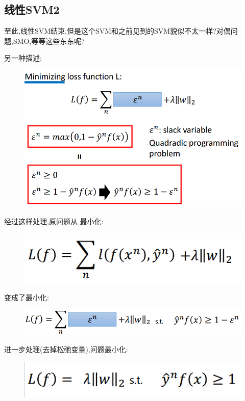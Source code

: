 \documentclass[UTF8,a4paper]{ctexart}
\begin{document}
        \subsection{线性SVM2}
        {\color{red} 至此,线性SVM结束,但是这个SVM和之前见到的SVM貌似不太一样?对偶问题,SMO,等等这些东东呢?}

        另一种描述:
        \begin{figure}[H]
            \centering
            \includegraphics[scale = 0.3]{assets/ML_e1a0b.png}
        \end{figure}

        经过这样处理,原问题从
        最小化:
        \begin{figure}[H]
            \centering
            \includegraphics[scale = 0.3]{assets/ML_5215d.png}
        \end{figure}

        变成了最小化:
        \begin{figure}[H]
            \centering
            \includegraphics[scale = 0.3]{assets/ML_a74a0.png}
        \end{figure}

        进一步处理(去掉松弛变量),问题最小化:
        \begin{figure}[H]
            \centering
            \includegraphics[scale = 0.3]{assets/ML_371e4.png}
        \end{figure}
\end{document}
